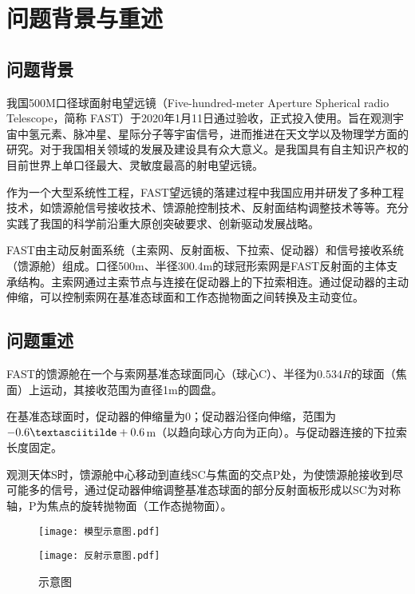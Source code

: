 \documentclass[withoutpreface,bwprint,fontset=macnew]{cumcmthesis} %
\begin{document}
	
	\section{问题背景与重述}
	\subsection{问题背景}
	我国500M口径球面射电望远镜（Five-hundred-meter Aperture Spherical radio Telescope，简称 FAST）于2020年1月11日通过验收，正式投入使用。旨在观测宇宙中氢元素、脉冲星、星际分子等宇宙信号，进而推进在天文学以及物理学方面的研究。对于我国相关领域的发展及建设具有众大意义。是我国具有自主知识产权的目前世界上单口径最大、灵敏度最高的射电望远镜。

	作为一个大型系统性工程，FAST望远镜的落建过程中我国应用并研发了多种工程技术，如馈源舱信号接收技术、馈源舱控制技术、反射面结构调整技术等等。充分实践了我国的科学前沿重大原创突破要求、创新驱动发展战略。

	FAST由主动反射面系统（主索网、反射面板、下拉索、促动器）和信号接收系统（馈源舱）组成。口径500m、半径300.4m的球冠形索网是FAST反射面的主体支承结构。主索网通过主索节点与连接在促动器上的下拉索相连。通过促动器的主动伸缩，可以控制索网在基准态球面和工作态抛物面之间转换及主动变位。

	\subsection{问题重述}

	FAST的馈源舱在一个与索网基准态球面同心（球心C）、半径为$0.534R$的球面（焦面）上运动，其接收范围为直径1m的圆盘。

	在基准态球面时，促动器的伸缩量为0；促动器沿径向伸缩，范围为$-0.6 \textasciitilde +0.6$m（以趋向球心方向为正向）。与促动器连接的下拉索长度固定。

	观测天体S时，馈源舱中心移动到直线SC与焦面的交点P处，为使馈源舱接收到尽可能多的信号，通过促动器伸缩调整基准态球面的部分反射面板形成以SC为对称轴，P为焦点的旋转抛物面（工作态抛物面）。
	
	\begin{figure}[!h]
		\centering
		\begin{minipage}[c]{0.48\textwidth}
			\centering
			\texttt{[image: 模型示意图.pdf]}
			\label{fig:sample-figure-a}
		\end{minipage}
		\begin{minipage}[c]{0.48\textwidth}
			\centering
			\texttt{[image: 反射示意图.pdf]}
			\label{fig:sample-figure-b}
		\end{minipage}
		\caption{示意图}
		\label{fig:sample-figure}
	\end{figure}
\end{document}
